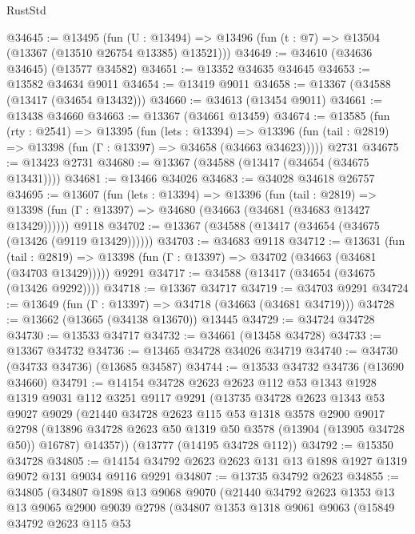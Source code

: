 \begin{lexlean}{RustStd}
\begin{coremodule}
@34645 := @13495
    (fun (U : @13494) => @13496 (fun (t : @7) => @13504 (@13367 (@13510 @26754 @13385) @13521)))
@34649 := @34610 (@34636 @34645) (@13577 @34582)
@34651 := @13352 @34635 @34645
@34653 := @13582 @34634 @9011
@34654 := @13419 @9011
@34658 := @13367 (@34588 (@13417 (@34654 @13432)))
@34660 := @34613 (@13454 @9011)
@34661 := @13438 @34660
@34663 := @13367 (@34661 @13459)
@34674 := @13585
    (fun (rty : @2541) =>
    @13395
      (fun (lets : @13394) =>
      @13396 (fun (tail : @2819) => @13398 (fun (Γ : @13397) => @34658 (@34663 @34623)))))
    @2731
@34675 := @13423 @2731
@34680 := @13367 (@34588 (@13417 (@34654 (@34675 @13431))))
@34681 := @13466 @34026
@34683 := @34028 @34618 @26757
@34695 := @13607
    (fun (lets : @13394) =>
    @13396
      (fun (tail : @2819) =>
      @13398 (fun (Γ : @13397) => @34680 (@34663 (@34681 (@34683 @13427 @13429))))))
    @9118
@34702 := @13367 (@34588 (@13417 (@34654 (@34675 (@13426 (@9119 @13429))))))
@34703 := @34683 @9118
@34712 := @13631
    (fun (tail : @2819) => @13398 (fun (Γ : @13397) => @34702 (@34663 (@34681 (@34703 @13429)))))
    @9291
@34717 := @34588 (@13417 (@34654 (@34675 (@13426 @9292))))
@34718 := @13367 @34717
@34719 := @34703 @9291
@34724 := @13649 (fun (Γ : @13397) => @34718 (@34663 (@34681 @34719)))
@34728 := @13662 (@13665 (@34138 @13670)) @13445
@34729 := @34724 @34728
@34730 := @13533 @34717
@34732 := @34661 (@13458 @34728)
@34733 := @13367 @34732
@34736 := @13465 @34728 @34026 @34719
@34740 := @34730 (@34733 @34736) (@13685 @34587)
@34744 := @13533 @34732 @34736 (@13690 @34660)
@34791 := @14154
    @34728
    @2623
    @2623
    @112
    @53
    @1343
    @1928
    @1319
    @9031
    @112
    @3251
    @9117
    @9291
    (@13735
      @34728
      @2623
      @1343
      @53
      @9027
      @9029
      (@21440
        @34728
        @2623
        @115
        @53
        @1318
        @3578
        @2900
        @9017
        @2798
        (@13896 @34728 @2623 @50 @1319 @50 @3578 (@13904 (@13905 @34728 @50)) @16787)
        @14357))
    (@13777 (@14195 @34728 @112))
@34792 := @15350 @34728
@34805 := @14154 @34792 @2623 @2623 @131 @13 @1898 @1927 @1319 @9072 @131 @9034 @9116 @9291
@34807 := @13735 @34792 @2623
@34855 := @34805
    (@34807
      @1898
      @13
      @9068
      @9070
      (@21440
        @34792
        @2623
        @1353
        @13
        @13
        @9065
        @2900
        @9039
        @2798
        (@34807
          @1353
          @1318
          @9061
          @9063
          (@15849
            @34792
            @2623
            @115
            @53

\end{coremodule}
\end{lexlean}
